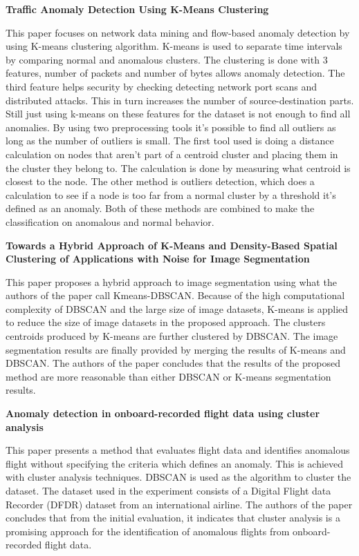 \documentclass[a4paper]{article}
\begin{document}
\textbf{Traffic Anomaly Detection Using K-Means Clustering}\cite{k-meansOutlier}

This paper focuses on network data mining and flow-based anomaly detection by using K-means clustering algorithm. K-means is used to separate time intervals by comparing normal and anomalous clusters. The clustering is done with 3 features, number of packets and number of bytes allows anomaly detection. The third feature helps security by checking detecting network
port scans and distributed attacks. This in turn increases the number of source-destination parts.
Still just using k-means on these features for the dataset is not enough to find all anomalies. By using two preprocessing tools it's possible to find all outliers as long as the number of outliers is small. The first tool used is doing a distance calculation on nodes that aren't part of a centroid cluster and placing them in the cluster they belong to. The calculation is done by measuring what centroid is closest to the node. The other method is outliers detection, which does a calculation  to see if a node is too far from a normal cluster by a threshold it's defined as an anomaly. Both of these methods are combined to make the classification on anomalous and normal behavior.

\textbf{Towards a Hybrid Approach of K-Means and Density-Based Spatial Clustering of Applications with Noise for Image Segmentation}\cite{k-meansDBSCANhybird}

This paper proposes a hybrid approach to image segmentation using what the authors of the paper call Kmeans-DBSCAN. Because of the
high computational complexity of DBSCAN and the large size
of image datasets, K-means is applied to reduce the size of image
datasets in the proposed approach. The clusters centroids produced by K-means are further
clustered by DBSCAN. The image segmentation results are
finally provided by merging the results of K-means and DBSCAN. The authors of the paper concludes that the results of the proposed method are more reasonable than either DBSCAN or K-means segmentation results.

\newpage
\textbf{Anomaly detection in onboard-recorded flight data using cluster analysis}\cite{airplane}


This paper presents a method that evaluates
flight data and identifies anomalous flight without specifying
the criteria which defines an anomaly. This is achieved with cluster analysis techniques. DBSCAN is used as the algorithm to cluster the dataset. The dataset used in the experiment consists of a Digital Flight data Recorder (DFDR) dataset from an international airline. The authors of the paper concludes that from the initial evaluation, it indicates that cluster analysis is a promising approach for the identification of anomalous flights from onboard-recorded flight data.
\end{document}
